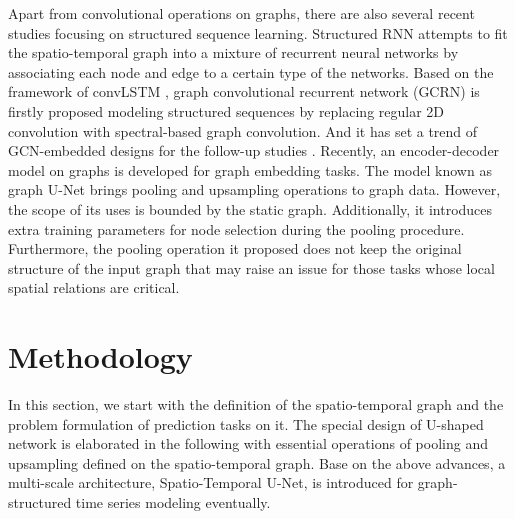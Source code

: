 \documentclass[sigconf,screen]{acmart}
\begin{document}
Apart from convolutional operations on graphs, there are also several recent studies focusing on structured sequence learning. Structured RNN \cite{jain2016structural} attempts to fit the spatio-temporal graph into a mixture of recurrent neural networks by associating each node and edge to a certain type of the networks. Based on the framework of convLSTM \cite{xingjian2015convolutional}, graph convolutional recurrent network (GCRN) \cite{seo2018structured} is firstly proposed modeling structured sequences by replacing regular 2D convolution with spectral-based graph convolution. And it has set a trend of GCN-embedded designs for the follow-up studies \cite{li2018dcrnn_traffic,yu2018spatio}. Recently, an encoder-decoder model on graphs is developed for graph embedding tasks. The model known as graph U-Net \cite{gao2019graph} brings pooling and upsampling operations to graph data. However, the scope of its uses is bounded by the static graph. Additionally, it introduces extra training parameters for node selection during the pooling procedure. Furthermore, the pooling operation it proposed does not keep the original structure of the input graph that may raise an issue for those tasks whose local spatial relations are critical.


\section{Methodology}
In this section, we start with the definition of the spatio-temporal graph and the problem formulation of prediction tasks on it. The special design of U-shaped network is elaborated in the following with essential operations of pooling and upsampling defined on the spatio-temporal graph. Base on the above advances, a multi-scale architecture, Spatio-Temporal U-Net, is introduced for graph-structured time series modeling eventually.
\end{document}
